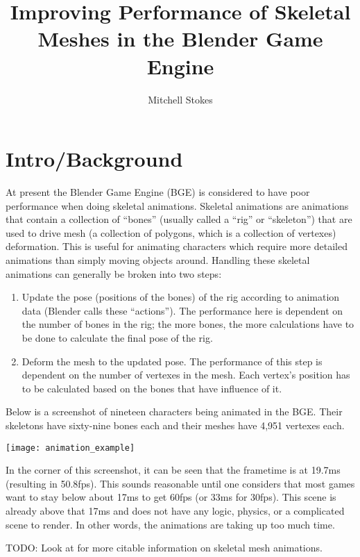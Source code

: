 \documentclass[10pt]{article}
\title{Improving Performance of Skeletal Meshes in the Blender Game Engine}
\author{Mitchell Stokes}
\newcommand{\todo}[1] {{\color{todo} TODO: #1}}
\begin{document}
\maketitle

\section{Intro/Background}
At present the Blender Game Engine (BGE) is considered to have poor performance when doing skeletal animations. Skeletal animations are animations that contain a collection of ``bones'' (usually called a ``rig'' or ``skeleton'') that are used to drive  mesh (a collection of polygons, which is a collection of vertexes) deformation. This is useful for animating characters which require more detailed animations than simply moving objects around. Handling these skeletal animations can generally be broken into two steps:

\begin{enumerate}
  \item Update the pose (positions of the bones) of the rig according to animation data (Blender calls these ``actions''). The performance here is dependent on the number of bones in the rig; the more bones, the more calculations have to be done to calculate the final pose of the rig.
  \item Deform the mesh to the updated pose. The performance of this step is dependent on the number of vertexes in the mesh. Each vertex's position has to be calculated based on the bones that have influence of it.
\end{enumerate}

Below is a screenshot of nineteen characters being animated in the BGE. Their skeletons have sixty-nine bones each and their meshes have 4,951 vertexes each.

\medskip
\begin{center}
\texttt{[image: animation\_example]}
\end{center}

In the corner of this screenshot, it can be seen that the frametime is at 19.7ms (resulting in 50.8fps). This sounds reasonable until one considers that most games want to stay below about 17ms to get 60fps (or 33ms for 30fps). This scene is already above that 17ms and does not have any logic, physics, or a complicated scene to render. In other words, the animations are taking up too much time.

\todo{Look at \cite{Gregory2009} for more citable information on skeletal mesh animations.}
\end{document}
